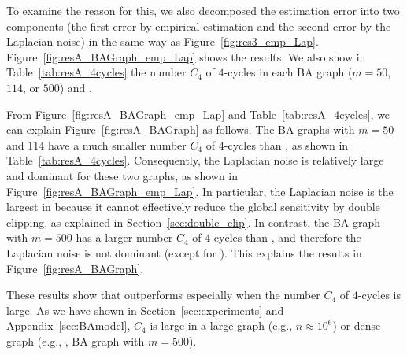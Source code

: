 {To examine the reason for this, we also decomposed the estimation error into two components (the first error by empirical estimation and the second error by the Laplacian noise) in the same way as Figure~\ref{fig:res3_emp_Lap}.
Figure~\ref{fig:resA_BAGraph_emp_Lap} shows the results.
We also show in Table~\ref{tab:resA_4cycles} the number $C_4$ of $4$-cycles in each BA graph ($m=50$, $114$, or $500$) and \GPlus{}.

From Figure~\ref{fig:resA_BAGraph_emp_Lap} and Table~\ref{tab:resA_4cycles}, we can explain Figure~\ref{fig:resA_BAGraph} as follows.
The BA graphs with $m=50$ and $114$ have a much smaller number $C_4$ of $4$-cycles than \GPlus{}, as shown in Table~\ref{tab:resA_4cycles}.
Consequently,
the Laplacian noise is relatively large and dominant for these two graphs, as shown in Figure~\ref{fig:resA_BAGraph_emp_Lap}.
In particular,
the Laplacian noise is the largest in \AlgThree{} because it cannot effectively reduce the global sensitivity by double clipping, as explained in Section~\ref{sec:double_clip}.
In contrast, the BA graph with $m=500$ has a larger number $C_4$ of $4$-cycles than \GPlus{}, and therefore the Laplacian noise is not dominant (except for \AlgThree{}).
This explains the results in Figure~\ref{fig:resA_BAGraph}.

These results
show that \AlgTwo{} outperforms \AlgOne{} especially when the number $C_4$ of $4$-cycles is large.
As we have shown in Section~\ref{sec:experiments} and Appendix~\ref{sec:BAmodel}, $C_4$ is large in a large graph (e.g., $n \approx 10^6$) or dense graph (e.g., \GPlus{}, BA graph with $m=500$).

}
